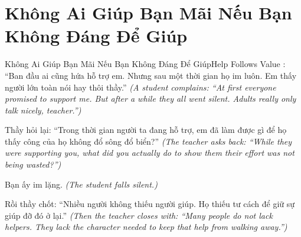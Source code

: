 \section{Không Ai Giúp Bạn Mãi Nếu Bạn Không Đáng Để Giúp}
\begin{truyen}{Không Ai Giúp Bạn Mãi Nếu Bạn Không Đáng Để Giúp}{Help Follows Value}
: ``Ban đầu ai cũng hứa hỗ trợ em. Nhưng sau một thời gian họ im luôn. Em thấy người lớn toàn nói hay thôi thầy.''
\textit{(A student complains: ``At first everyone promised to support me. But after a while they all went silent. Adults really only talk nicely, teacher.'')}

Thầy hỏi lại: ``Trong thời gian người ta đang hỗ trợ, em đã làm được gì để họ thấy công của họ không đổ sông đổ biển?''
\textit{(The teacher asks back: ``While they were supporting you, what did you actually do to show them their effort was not being wasted?'')}

Bạn ấy im lặng.
\textit{(The student falls silent.)}


Rồi thầy chốt: ``Nhiều người không thiếu người giúp. Họ thiếu tư cách để giữ sự giúp đỡ đó ở lại.''
\textit{(Then the teacher closes with: ``Many people do not lack helpers. They lack the character needed to keep that help from walking away.'')}
\end{truyen}

